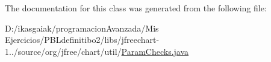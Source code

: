 The documentation for this class was generated from the following file\+:\begin{DoxyCompactItemize}
\item 
D\+:/ikasgaiak/programacion\+Avanzada/\+Mis Ejercicios/\+P\+B\+Ldefinitibo2/libs/jfreechart-\/1../source/org/jfree/chart/util/\mbox{\hyperlink{_param_checks_8java}{Param\+Checks.\+java}}\end{DoxyCompactItemize}
